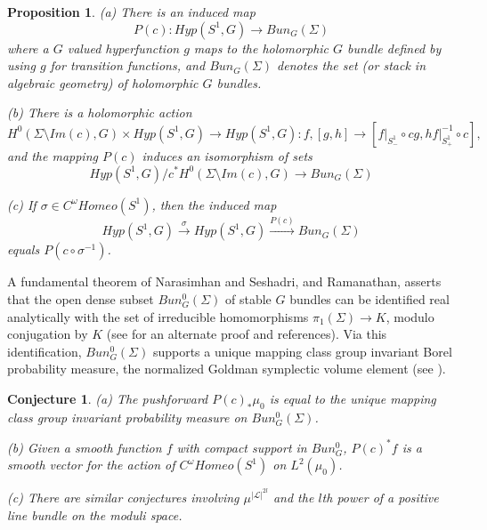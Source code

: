 \documentclass{amsart}
\newtheorem{proposition}{Proposition}
\theoremstyle{conjecture}
\newtheorem{conjecture}{Conjecture}
\theoremstyle{definition}
\theoremstyle{question}
\theoremstyle{questions}
\theoremstyle{remark}
\theoremstyle{remarks}
\theoremstyle{example}
\numberwithin{equation}{section}
\begin{document}
\begin{proposition} (a) There is an induced map
$$P(c):Hyp(S^1,G) \to Bun_G(\Sigma) $$
where a $G$ valued hyperfunction $g$ maps to the holomorphic $G$ bundle defined by using $g$ for transition functions, and $Bun_G(\Sigma)$ denotes the set (or stack in algebraic geometry) of holomorphic $G$ bundles.

(b) There is a holomorphic action
$$H^0(\Sigma\setminus Im(c),G)\times Hyp(S^1,G)\to Hyp(S^1,G):f,[g,h]\to
[f\vert_{S^1_{-}}\circ c g,h f\vert_{S^1_{+}}^{-1}\circ c],$$
and the mapping $P(c)$ induces an isomorphism of sets
$$Hyp(S^1,G)/c^*H^0(\Sigma\setminus Im(c),G)\to Bun_G(\Sigma)$$

(c) If $\sigma\in C^{\omega}Homeo(S^1)$, then the induced map
$$Hyp(S^1,G)\stackrel{\sigma}{\rightarrow}Hyp(S^1,G)\stackrel{P(c)}{\rightarrow}Bun_G(\Sigma)$$
equals $P(c\circ\sigma^{-1})$.
\end{proposition}


A fundamental theorem of Narasimhan and Seshadri, and Ramanathan, asserts that the open
dense subset $Bun_G^0(\Sigma)$ of stable $G$ bundles can be identified real analytically
with the set of irreducible homomorphisms $\pi_1(\Sigma)\to K$, modulo conjugation by $K$ (see \cite{Donaldson}
for an alternate proof and references). Via this identification, $Bun_G^0(\Sigma)$ supports a unique mapping class group invariant Borel probability measure, the normalized Goldman symplectic volume element (see \cite{Pi1.5}).

\begin{conjecture}\label{conj4} (a) The pushforward $P(c)_*\mu_0$ is equal to
the unique mapping class group invariant probability measure on $Bun_G^0(\Sigma)$.

(b) Given a smooth function $f$ with compact support in $Bun_G^0$, $P(c)^*f$ is a smooth vector for the action
of $C^{\omega}Homeo(S^1)$ on $L^2(\mu_0)$.

(c) There are similar conjectures involving $\mu^{|\mathcal L|^{2l}}$ and the $l$th power of a positive line bundle on the moduli space.
\end{conjecture}
\end{document}
